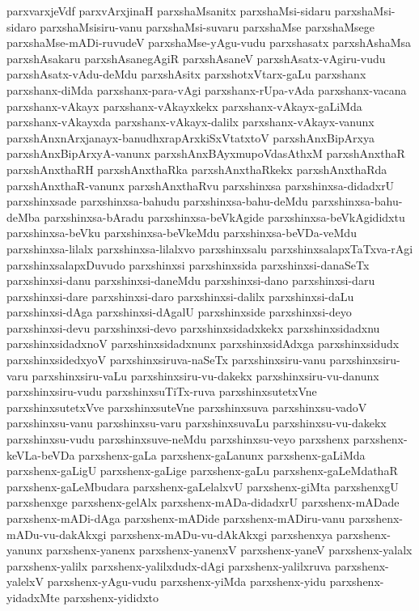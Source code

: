 {parxvarxjeVdf
parxvArxjinaH
parxshaMsanitx
parxshaMsi-sidaru
parxshaMsi-sidaro
parxshaMsisiru-vanu
parxshaMsi-suvaru
parxshaMse
parxshaMsege
parxshaMse-mADi-ruvudeV
parxshaMse-yAgu-vudu
parxshasatx
parxshAshaMsa
parxshAsakaru
parxshAsanegAgiR
parxshAsaneV
parxshAsatx-vAgiru-vudu
parxshAsatx-vAdu-deMdu
parxshAsitx
parxshotxVtarx-gaLu
parxshanx
parxshanx-diMda
parxshanx-para-vAgi
parxshanx-rUpa-vAda
parxshanx-vacana
parxshanx-vAkayx
parxshanx-vAkayxkekx
parxshanx-vAkayx-gaLiMda
parxshanx-vAkayxda
parxshanx-vAkayx-dalilx
parxshanx-vAkayx-vanunx
parxshAnxnArxjanayx-banudhxrapArxkiSxVtatxtoV
parxshAnxBipArxya
parxshAnxBipArxyA-vanunx
parxshAnxBAyxmupoVdasAthxM
parxshAnxthaR
parxshAnxthaRH
parxshAnxthaRka
parxshAnxthaRkekx
parxshAnxthaRda
parxshAnxthaR-vanunx
parxshAnxthaRvu
parxshinxsa
parxshinxsa-didadxrU
parxshinxsade
parxshinxsa-bahudu
parxshinxsa-bahu-deMdu
parxshinxsa-bahu-deMba
parxshinxsa-bAradu
parxshinxsa-beVkAgide
parxshinxsa-beVkAgididxtu
parxshinxsa-beVku
parxshinxsa-beVkeMdu
parxshinxsa-beVDa-veMdu
parxshinxsa-lilalx
parxshinxsa-lilalxvo
parxshinxsalu
parxshinxsalapxTaTxva-rAgi
parxshinxsalapxDuvudo
parxshinxsi
parxshinxsida
parxshinxsi-danaSeTx
parxshinxsi-danu
parxshinxsi-daneMdu
parxshinxsi-dano
parxshinxsi-daru
parxshinxsi-dare
parxshinxsi-daro
parxshinxsi-dalilx
parxshinxsi-daLu
parxshinxsi-dAga
parxshinxsi-dAgalU
parxshinxside
parxshinxsi-deyo
parxshinxsi-devu
parxshinxsi-devo
parxshinxsidadxkekx
parxshinxsidadxnu
parxshinxsidadxnoV
parxshinxsidadxnunx
parxshinxsidAdxga
parxshinxsidudx
parxshinxsidedxyoV
parxshinxsiruva-naSeTx
parxshinxsiru-vanu
parxshinxsiru-varu
parxshinxsiru-vaLu
parxshinxsiru-vu-dakekx
parxshinxsiru-vu-danunx
parxshinxsiru-vudu
parxshinxsuTiTx-ruva
parxshinxsutetxVne
parxshinxsutetxVve
parxshinxsuteVne
parxshinxsuva
parxshinxsu-vadoV
parxshinxsu-vanu
parxshinxsu-varu
parxshinxsuvaLu
parxshinxsu-vu-dakekx
parxshinxsu-vudu
parxshinxsuve-neMdu
parxshinxsu-veyo
parxshenx
parxshenx-keVLa-beVDa
parxshenx-gaLa
parxshenx-gaLanunx
parxshenx-gaLiMda
parxshenx-gaLigU
parxshenx-gaLige
parxshenx-gaLu
parxshenx-gaLeMdathaR
parxshenx-gaLeMbudara
parxshenx-gaLelalxvU
parxshenx-giMta
parxshenxgU
parxshenxge
parxshenx-gelAlx
parxshenx-mADa-didadxrU
parxshenx-mADade
parxshenx-mADi-dAga
parxshenx-mADide
parxshenx-mADiru-vanu
parxshenx-mADu-vu-dakAkxgi
parxshenx-mADu-vu-dAkAkxgi
parxshenxya
parxshenx-yanunx
parxshenx-yanenx
parxshenx-yanenxV
parxshenx-yaneV
parxshenx-yalalx
parxshenx-yalilx
parxshenx-yalilxdudx-dAgi
parxshenx-yalilxruva
parxshenx-yalelxV
parxshenx-yAgu-vudu
parxshenx-yiMda
parxshenx-yidu
parxshenx-yidadxMte
parxshenx-yididxto
}
